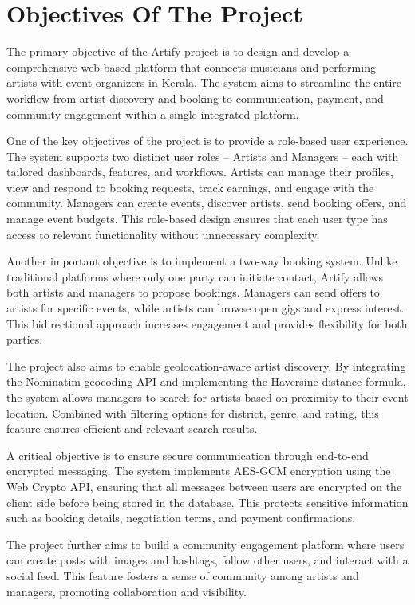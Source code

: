 \documentclass[12pt,a4paper]{report}
\begin{document}
\section{Objectives Of The Project}
The primary objective of the Artify project is to design and develop a comprehensive web-based platform that connects musicians and performing artists with event organizers in Kerala. The system aims to streamline the entire workflow from artist discovery and booking to communication, payment, and community engagement within a single integrated platform.

One of the key objectives of the project is to provide a role-based user experience. The system supports two distinct user roles -- Artists and Managers -- each with tailored dashboards, features, and workflows. Artists can manage their profiles, view and respond to booking requests, track earnings, and engage with the community. Managers can create events, discover artists, send booking offers, and manage event budgets. This role-based design ensures that each user type has access to relevant functionality without unnecessary complexity.

Another important objective is to implement a two-way booking system. Unlike traditional platforms where only one party can initiate contact, Artify allows both artists and managers to propose bookings. Managers can send offers to artists for specific events, while artists can browse open gigs and express interest. This bidirectional approach increases engagement and provides flexibility for both parties.

The project also aims to enable geolocation-aware artist discovery. By integrating the Nominatim geocoding API and implementing the Haversine distance formula, the system allows managers to search for artists based on proximity to their event location. Combined with filtering options for district, genre, and rating, this feature ensures efficient and relevant search results.

A critical objective is to ensure secure communication through end-to-end encrypted messaging. The system implements AES-GCM encryption using the Web Crypto API, ensuring that all messages between users are encrypted on the client side before being stored in the database. This protects sensitive information such as booking details, negotiation terms, and payment confirmations.

The project further aims to build a community engagement platform where users can create posts with images and hashtags, follow other users, and interact with a social feed. This feature fosters a sense of community among artists and managers, promoting collaboration and visibility.
\end{document}
